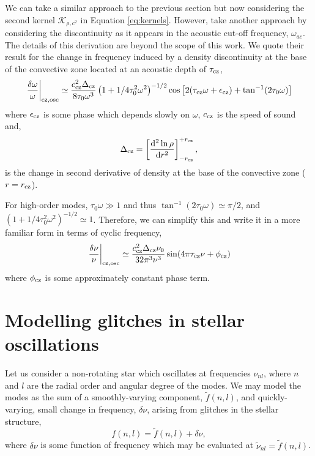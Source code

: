 We can take a similar approach to the previous section but now considering the second kernel \(\mathcal{K}_{\rho,c^2}\) in Equation \ref{eq:kernels}. However, \citet{Houdek.Gough2007} take another approach by considering the discontinuity as it appears in the acoustic cut-off frequency, \(\omega_{ac}\). The details of this derivation are beyond the scope of this work. We quote their result for the change in frequency induced by a density discontinuity at the base of the convective zone located at an acoustic depth of \(\tau_{{\mathrm{cz}}}\),
%
\begin{equation}
    \left.\frac{\delta\omega}{\omega}\right|_{{\mathrm{cz}},\mathrm{osc}} \simeq \frac{c_{{\mathrm{cz}}}^2\Delta_{{\mathrm{cz}}}}{8\tau_0 \omega^3} \left(1 + {1}/{4\tau_0^2\omega^2}\right)^{-1/2} \cos\left[2(\tau_{{\mathrm{cz}}} \omega + \epsilon_{{\mathrm{cz}}}) + \tan^{-1}(2\tau_0\omega)\right]
\end{equation}
%
where \(\epsilon_{{\mathrm{cz}}}\) is some phase which depends slowly on \(\omega\), \(c_{{\mathrm{cz}}}\) is the speed of sound and,
%
\begin{equation}
    \Delta_{{\mathrm{cz}}} = \left[\frac{\mathrm{d}^2 \ln\rho}{\mathrm{d} r^2}\right]_{-r_{{\mathrm{cz}}}}^{+r_{{\mathrm{cz}}}},
\end{equation}
%
is the change in second derivative of density at the base of the convective zone (\(r = r_{{\mathrm{cz}}}\)).

For high-order modes, \(\tau_0 \omega \gg 1\) and thus \(\tan^{-1}(2\tau_0\omega) \simeq \pi/2\), and \((1 + {1}/{4\tau_0^2\omega^2})^{-1/2} \simeq 1\). Therefore, we can simplify this and write it in a more familiar form in terms of cyclic frequency,
%
\begin{equation}
    \left.\frac{\delta\nu}{\nu}\right|_{{\mathrm{cz}},\mathrm{osc}} \simeq \frac{c_{{\mathrm{cz}}}^2\Delta_{{\mathrm{cz}}}\nu_0}{32\pi^3 \nu^3} \sin(4\pi\tau_{{\mathrm{cz}}}\nu + \phi_{{\mathrm{cz}}}) \label{eq:bcz-osc}
\end{equation}
%
where \(\phi_{{\mathrm{cz}}}\) is some approximately constant phase term.

\section[Modelling the glitch]{Modelling glitches in stellar oscillations}\label{sec:glitch-model}

Let us consider a non-rotating star which oscillates at frequencies \(\nu_{nl}\), where \(n\) and \(l\) are the radial order and angular degree of the modes. We may model the modes as the sum of a smoothly-varying component, \(\tilde{f}(n, l)\), and quickly-varying, small change in frequency, \(\delta\nu\), arising from glitches in the stellar structure,
%
\begin{equation}
    f(n, l) = \tilde{f}(n, l) + \delta\nu,\label{eq:general-glitch}
\end{equation}
%
where \(\delta\nu\) is some function of frequency which may be evaluated at \(\tilde{\nu}_{nl} = \tilde{f}(n, l)\).

